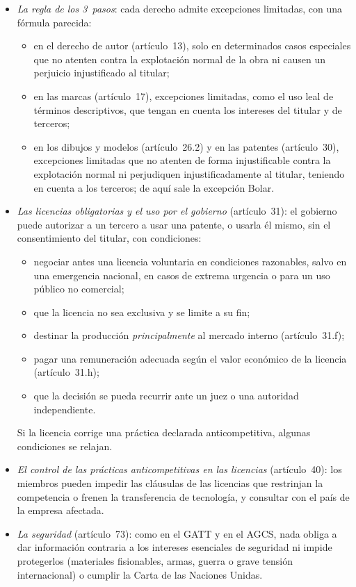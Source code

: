 \documentclass[11pt]{article}
\begin{document}
\begin{itemize}
\item \emph{La regla de los 3~pasos}: cada derecho admite excepciones limitadas, con una fórmula parecida\nocite{OMC1994ADPIC}:
  \begin{itemize}
  \item en el derecho de autor (artículo~13), solo en determinados casos especiales que no atenten contra la explotación normal de la obra ni causen un perjuicio injustificado al titular;
  \item en las marcas (artículo~17), excepciones limitadas, como el uso leal de términos descriptivos, que tengan en cuenta los intereses del titular y de terceros;
  \item en los dibujos y modelos (artículo~26.2) y en las patentes (artículo~30), excepciones limitadas que no atenten de forma injustificable contra la explotación normal ni perjudiquen injustificadamente al titular, teniendo en cuenta a los terceros; de aquí sale la excepción Bolar.
  \end{itemize}
\item \emph{Las licencias obligatorias y el uso por el gobierno} (artículo~31): el gobierno puede autorizar a un tercero a usar una patente, o usarla él mismo, sin el consentimiento del titular, con condiciones:
  \begin{itemize}
  \item negociar antes una licencia voluntaria en condiciones razonables, salvo en una emergencia nacional, en casos de extrema urgencia o para un uso público no comercial;
  \item que la licencia no sea exclusiva y se limite a su fin;
  \item destinar la producción \emph{principalmente} al mercado interno (artículo~31.f);
  \item pagar una remuneración adecuada según el valor económico de la licencia (artículo~31.h);
  \item que la decisión se pueda recurrir ante un juez o una autoridad independiente.
  \end{itemize}
  Si la licencia corrige una práctica declarada anticompetitiva, algunas condiciones se relajan.
\item \emph{El control de las prácticas anticompetitivas en las licencias} (artículo~40): los miembros pueden impedir las cláusulas de las licencias que restrinjan la competencia o frenen la transferencia de tecnología, y consultar con el país de la empresa afectada.
\item \emph{La seguridad} (artículo~73): como en el GATT y en el AGCS, nada obliga a dar información contraria a los intereses esenciales de seguridad ni impide protegerlos (materiales fisionables, armas, guerra o grave tensión internacional) o cumplir la Carta de las Naciones Unidas.
\end{itemize}
\end{document}
